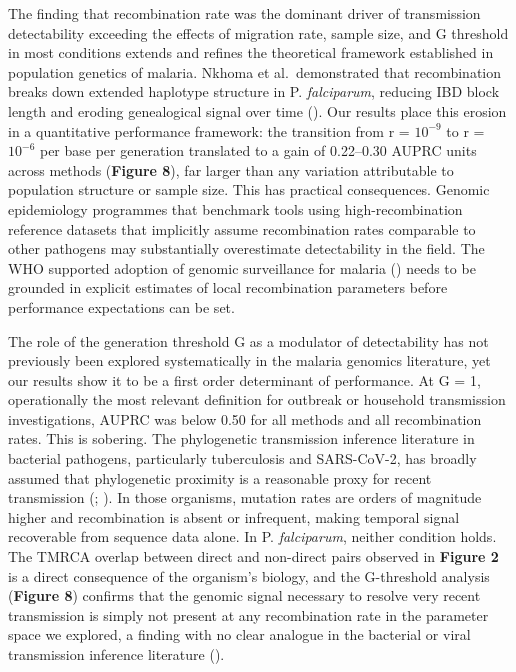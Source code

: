 \documentclass[
  11pt,
]{article}
\begin{document}
The finding that recombination rate was the dominant driver of
transmission detectability exceeding the effects of migration rate,
sample size, and G threshold in most conditions extends and refines the
theoretical framework established in population genetics of malaria.
Nkhoma et al.~demonstrated that recombination breaks down extended
haplotype structure in P. \emph{falciparum}, reducing IBD block length
and eroding genealogical signal over time
(). Our results place this
erosion in a quantitative performance framework: the transition from r =
\(10^{-9}\) to r = \(10^{-6}\) per base per generation translated to a
gain of 0.22--0.30 AUPRC units across methods (\textbf{Figure 8}), far
larger than any variation attributable to population structure or sample
size. This has practical consequences. Genomic epidemiology programmes
that benchmark tools using high-recombination reference datasets that
implicitly assume recombination rates comparable to other pathogens may
substantially overestimate detectability in the field. The WHO supported
adoption of genomic surveillance for malaria
() needs to
be grounded in explicit estimates of local recombination parameters
before performance expectations can be set.

The role of the generation threshold G as a modulator of detectability
has not previously been explored systematically in the malaria genomics
literature, yet our results show it to be a first order determinant of
performance. At G = 1, operationally the most relevant definition for
outbreak or household transmission investigations, AUPRC was below 0.50
for all methods and all recombination rates. This is sobering. The
phylogenetic transmission inference literature in bacterial pathogens,
particularly tuberculosis and SARS-CoV-2, has broadly assumed that
phylogenetic proximity is a reasonable proxy for recent transmission
(;
). In those organisms,
mutation rates are orders of magnitude higher and recombination is
absent or infrequent, making temporal signal recoverable from sequence
data alone. In P. \emph{falciparum}, neither condition holds. The TMRCA
overlap between direct and non-direct pairs observed in \textbf{Figure
2} is a direct consequence of the organism's biology, and the
G-threshold analysis (\textbf{Figure 8}) confirms that the genomic
signal necessary to resolve very recent transmission is simply not
present at any recombination rate in the parameter space we explored, a
finding with no clear analogue in the bacterial or viral transmission
inference literature ().
\end{document}
